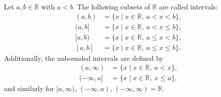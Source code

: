 Let $a, b \in \mathbb{R}$ with $a < b$. The following subsets of $\mathbb{R}$ are called intervals:
$$
\begin{aligned}
(a, b) &= \{x \mid x \in \mathbb{R},\ a < x < b\}, \\
(a, b] &= \{x \mid x \in \mathbb{R},\ a < x \leq b\}, \\
[a, b) &= \{x \mid x \in \mathbb{R},\ a \leq x < b\}, \\
[a, b] &= \{x \mid x \in \mathbb{R},\ a \leq x \leq b\}.
\end{aligned}
$$
Additionally, the unbounded intervals are defined by
$$
\begin{aligned}
(a, \infty) &= \{x \mid x \in \mathbb{R},\ a < x\}, \\
(-\infty, a] &= \{x \mid x \in \mathbb{R},\ x \leq a\},
\end{aligned}
$$
and similarly for $[a, \infty)$, $(-\infty, a)$, $(-\infty, \infty) = \mathbb{R}$.
